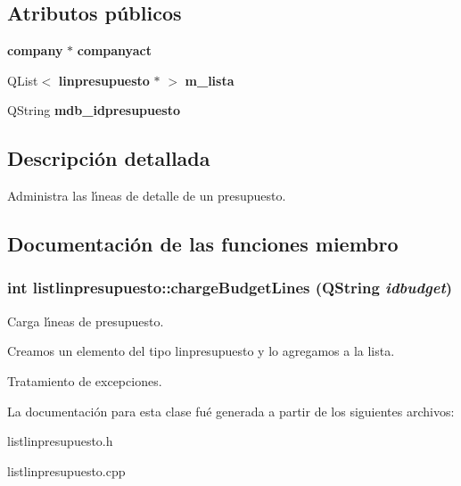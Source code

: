 \subsection*{Atributos p\'{u}blicos}
\begin{CompactItemize}
\item 
{\bf company} $\ast$ {\bf companyact}\label{classlistlinpresupuesto_o0}

\item 
QList$<$ {\bf linpresupuesto} $\ast$ $>$ {\bf m\_\-lista}\label{classlistlinpresupuesto_o1}

\item 
QString {\bf mdb\_\-idpresupuesto}\label{classlistlinpresupuesto_o2}

\end{CompactItemize}


\subsection{Descripci\'{o}n detallada}
Administra las l\'{\i}neas de detalle de un presupuesto. 



\subsection{Documentaci\'{o}n de las funciones miembro}
\subsubsection{\setlength{\rightskip}{0pt plus 5cm}int listlinpresupuesto::charge\-Budget\-Lines (QString {\em idbudget})}\label{classlistlinpresupuesto_a4}


Carga l\'{\i}neas de presupuesto. 

Creamos un elemento del tipo linpresupuesto y lo agregamos a la lista.

Tratamiento de excepciones. 

La documentaci\'{o}n para esta clase fu\'{e} generada a partir de los siguientes archivos:\begin{CompactItemize}
\item 
listlinpresupuesto.h\item 
listlinpresupuesto.cpp\end{CompactItemize}
